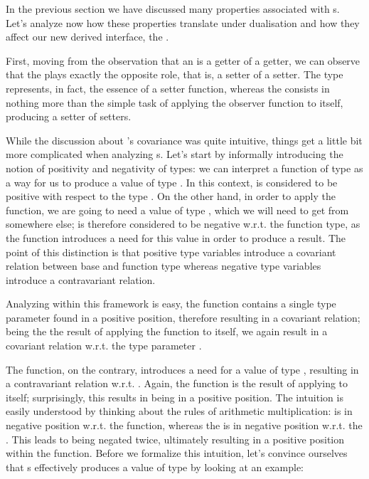 In the previous section we have discussed many properties associated with s. Let's analyze now how these properties translate under dualisation and how they affect our new derived interface, the .

First, moving from the observation that an  is a getter of a getter, we can observe that the  plays exactly the opposite role, that is, a setter of a setter. The type  represents, in fact, the essence of a setter function, whereas the  consists in nothing more than the simple task of applying the observer function to itself, producing a setter of setters. 

While the discussion about 's covariance was quite intuitive, things get a little bit more complicated when analyzing s. Let's start by informally introducing the notion of positivity and negativity of types: we can interpret a function of type  as a way for us to produce a value of type . In this context,  is considered to be positive with respect to the type . On the other hand, in order to apply the function, we are going to need a value of type , which we will need to get from somewhere else;  is therefore considered to be negative w.r.t. the function type, as the function introduces a need for this value in order to produce a result. The point of this distinction is that positive type variables introduce a covariant relation between base and function type whereas negative type variables introduce a contravariant relation.

Analyzing  within this framework is easy, the  function contains a single type parameter found in a positive position, therefore resulting in a covariant relation; being the  the result of applying the  function to itself, we again result in a covariant relation w.r.t. the type parameter .

The  function, on the contrary, introduces a need for a value of type , resulting in a contravariant relation w.r.t. . Again, the  function is the result of applying  to itself; surprisingly, this results in  being in a positive position. The intuition is easily understood by thinking about the rules of arithmetic multiplication:  is in negative position w.r.t. the  function, whereas the  is in negative position w.r.t. the . This leads to  being negated twice, ultimately resulting in a positive position within the  function. Before we formalize this intuition, let's convince ourselves that s effectively produces a value of type  by looking at an example:\\

